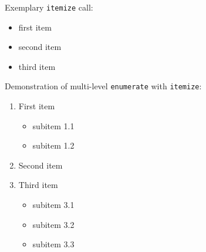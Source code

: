 \documentclass{beamer}
\begin{document}
\begin{frame}
  Exemplary \texttt{itemize} call:
  \begin{itemize}
    \item first item
    \item second item
    \item third item
  \end{itemize}
\end{frame}

\begin{frame}
    Demonstration of multi-level \texttt{enumerate} with \texttt{itemize}:
    \begin{enumerate}
        \item First item
            \begin{itemize}
                \item subitem 1.1
                \item subitem 1.2
            \end{itemize}
        \item Second item
        \item Third item
            \begin{itemize}
                \item subitem 3.1
                \item subitem 3.2
                \item subitem 3.3
            \end{itemize}
    \end{enumerate}
\end{frame}
\end{document}

